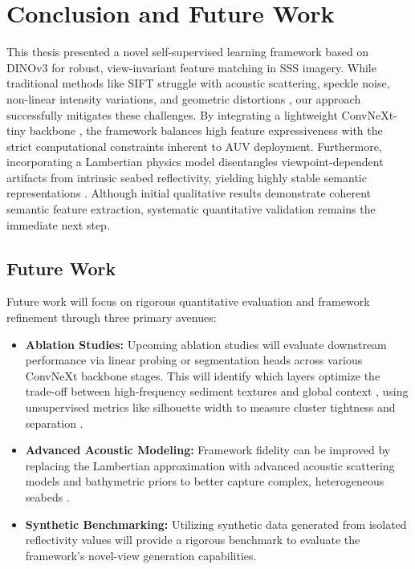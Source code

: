 \documentclass[12pt]{article}
\begin{document}
\section{Conclusion and Future Work}

This thesis presented a novel self-supervised learning framework based on DINOv3 \cite{oriane2025} for robust, view-invariant feature matching in SSS imagery. While traditional methods like SIFT struggle with acoustic scattering, speckle noise, non-linear intensity variations, and geometric distortions \cite{lowe2004, katrusha2025}, our approach successfully mitigates these challenges. By integrating a lightweight ConvNeXt-tiny backbone \cite{liu2022, ConvNextV2}, the framework balances high feature expressiveness with the strict computational constraints inherent to AUV deployment. Furthermore, incorporating a Lambertian physics model disentangles viewpoint-dependent artifacts from intrinsic seabed reflectivity, yielding highly stable semantic representations \cite{can2025_physdnet, yvan_petillot}. Although initial qualitative results demonstrate coherent semantic feature extraction, systematic quantitative validation remains the immediate next step.

\subsection{Future Work}
Future work will focus on rigorous quantitative evaluation and framework refinement through three primary avenues:

\begin{itemize}
    \item \textbf{Ablation Studies:} Upcoming ablation studies will evaluate downstream performance via linear probing or segmentation heads across various ConvNeXt backbone stages. This will identify which layers optimize the trade-off between high-frequency sediment textures and global context \cite{oquab2024}, using unsupervised metrics like silhouette width to measure cluster tightness and separation \cite{silhoutte_ablation}.
    \item \textbf{Advanced Acoustic Modeling:} Framework fidelity can be improved by replacing the Lambertian approximation with advanced acoustic scattering models and bathymetric priors to better capture complex, heterogeneous seabeds \cite{can2025_physdnet, yvan_petillot}.
    \item \textbf{Synthetic Benchmarking:} Utilizing synthetic data generated from isolated reflectivity values will provide a rigorous benchmark to evaluate the framework's novel-view generation capabilities.
\end{itemize}





\end{document}
